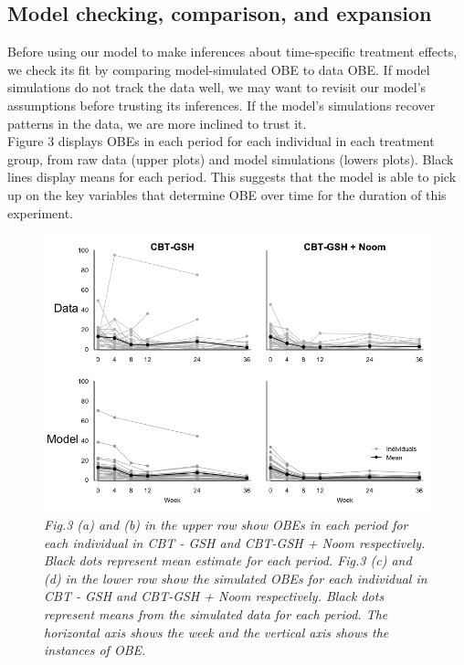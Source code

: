 \documentclass{article}
\begin{document}
\subsection{Model checking, comparison, and expansion}
Before using our model to make inferences about time-specific treatment effects, we check its fit by comparing model-simulated OBE to data OBE.  If model simulations do not track the data well, we may want to revisit our model's assumptions before trusting its inferences.  If the model's simulations recover patterns in the data, we are more inclined to trust it. \\
Figure 3 displays OBEs in each period for each individual in each treatment group, from raw data (upper plots) and model simulations (lowers plots).  Black lines display means for each period.  This suggests that the model is able to pick up on the key variables that determine OBE over time for the duration of this experiment.
%
\begin{figure}[H]
\begin{center}
\includegraphics[width=\textwidth, height=\textheight, keepaspectratio]{ppc_sims.png}
\caption{\emph{Fig.3 (a) and (b) in the upper row show OBEs in each period for each individual in CBT - GSH and CBT-GSH + Noom respectively. Black dots represent mean estimate for each  period. Fig.3 (c) and (d) in the lower row show the simulated OBEs for each individual in CBT - GSH and CBT-GSH + Noom respectively. Black dots represent means from the simulated data for each period. The horizontal axis shows the week and the vertical axis shows the instances of OBE.}}
\end{center}
\end{figure}
\end{document}
